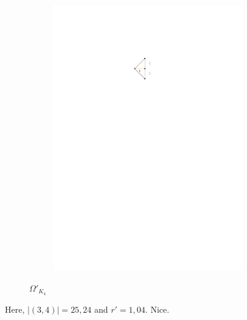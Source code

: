 	\begin{figure}[H]
	\centering
	\begin{subfigure}{0.6\linewidth}
		\centering
		\includegraphics[width=0.9\textwidth,page=15]{drawings/maximal_planar.pdf}
	\end{subfigure}
	\caption{$\Omega'_{K_4}$}
\end{figure}
Here, $|(3,4)|=25,24$ and $r' = 1,04$. Nice.